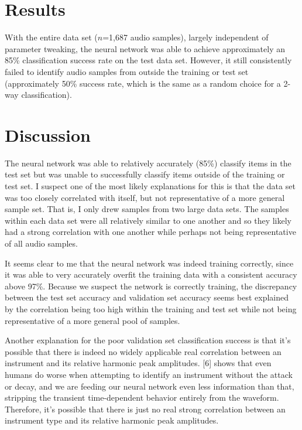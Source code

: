 \documentclass[12pt]{article}
\begin{document}
\section{Results}
	With the entire data set ($n$=1,687 audio samples), largely independent of parameter tweaking, the neural network was able to achieve approximately an 85\% classification success rate on the test data set. However, it still consistently failed to identify audio samples from outside the training or test set (approximately 50\% success rate, which is the same as a random choice for a 2-way classification).

\section{Discussion}
	The neural network was able to relatively accurately (85\%) classify items in the test set but was unable to successfully classify items outside of the training or test set. I suspect one of the most likely explanations for this is that the data set was too closely correlated with itself, but not representative of a more general sample set. That is, I only drew samples from two large data sets. The samples within each data set were all relatively similar to one another and so they likely had a strong correlation with one another while perhaps not being representative of all audio samples.
	
	It seems clear to me that the neural network was indeed training correctly, since it was able to very accurately overfit the training data with a consistent accuracy above 97\%. Because we suspect the network is correctly training, the discrepancy between the test set accuracy and validation set accuracy seems best explained by the correlation being too high within the training and test set while not being representative of a more general pool of samples.
	
	Another explanation for the poor validation set classification success is that it's possible that there is indeed no widely applicable real correlation between an instrument and its relative harmonic peak amplitudes. [6] shows that even humans do worse when attempting to identify an instrument without the attack or decay, and we are feeding our neural network even less information than that, stripping the transient time-dependent behavior entirely from the waveform. Therefore, it's possible that there is just no real strong correlation between an instrument type and its relative harmonic peak amplitudes.
\end{document}

